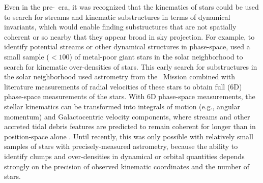 \documentclass[final,5p,times,twocolumn,authoryear]{elsarticle}
\begin{document}
Even in the pre-\gaia\ era, it was recognized that the kinematics of stars could be used
to search for streams and kinematic substructures in terms of dynamical invariants,
which would enable finding substructures that are not spatially coherent or so nearby
that they appear broad in sky projection.
For example, to identify potential streams or other dynamical structures in phase-space,
\citet{helmi:1999} used a small sample ($<100$) of metal-poor giant stars in the solar
neighborhood to search for kinematic over-densities of stars.
This early search for substructures in the solar neighborhood used astrometry from the
\hipparcos\ Mission \citep{perryman:1997} combined with literature measurements of
radial velocities of these stars to obtain full (6D) phase-space measurements of the
stars.
With 6D phase-space measurements, the stellar kinematics can be transformed into
integrals of motion (e.g., angular momentum) and Galactocentric velocity components,
where streams and other accreted tidal debris features are predicted to remain coherent
for longer than in position-space alone \citep{helmi:1999, sanderson:2015}.
Until recently, this was only possible with relatively small samples of stars with
precisely-measured astrometry, because the ability to identify clumps and over-densities
in dynamical or orbital quantities depends strongly on the precision of observed
kinematic coordinates and the number of stars.
\end{document}
